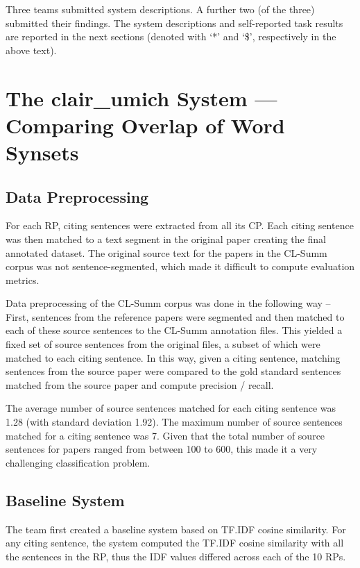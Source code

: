 \documentclass[11pt]{article}
\begin{document}
Three teams submitted system descriptions.  A further two (of the
three) submitted their findings.  The system descriptions and
self-reported task results are reported in the next sections (denoted
with `*' and `\$', respectively in the above text). 

\section{The clair\_umich System --- Comparing Overlap of Word Synsets}
\label{s:umich}
\subsection{Data Preprocessing}

For each RP, citing sentences were extracted from all its CP. Each
citing sentence was then matched to a text segment in the original
paper creating the final annotated dataset. The original source text
for the papers in the CL-Summ corpus was not sentence-segmented, which
made it difficult to compute evaluation metrics.

Data preprocessing of the CL-Summ corpus was done in the following way -- First, 
sentences from the reference papers were segmented and then matched to each of 
these source sentences to the CL-Summ annotation files. This yielded a fixed 
set of source sentences from the original files, a subset of which were 
matched to each citing sentence. In this way, given a citing sentence, 
matching sentences from the source paper were compared to the gold standard 
sentences matched from the source paper and compute precision / recall. 

The average number of source sentences matched for each citing sentence was 
1.28 (with standard deviation 1.92). The maximum number of source sentences 
matched for a citing sentence was 7. Given that the total number of source 
sentences for papers ranged from between 100 to 600, this made it a very 
challenging classification problem. 

\subsection{Baseline System}

The team first created a baseline system based on TF.IDF cosine
similarity. For any citing sentence, the system computed the TF.IDF
cosine similarity with all the sentences in the RP, thus the IDF
values differed across each of the 10 RPs.
\end{document}
